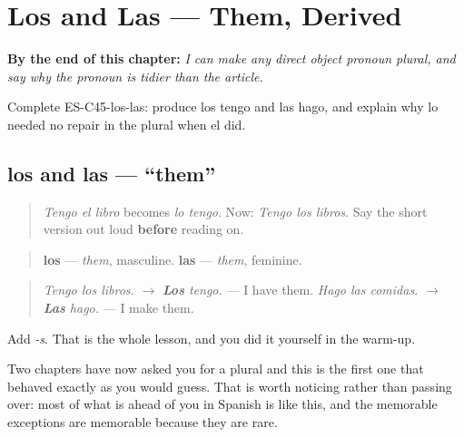 
\chapter{Los and Las --- Them, Derived}
\label{ch:pronoun-plural}

\begin{chapteropening}
\textbf{By the end of this chapter:} \emph{I can make any direct object pronoun plural, and say why the pronoun is tidier than the article.}

Complete ES-C45-los-las: produce los tengo and las hago, and explain why lo needed no repair in the plural when el did.
\end{chapteropening}

\section[los, las]{los and las — \textquotedblleft{}them\textquotedblright{}}

\label{lesson:ES-C45-los-las}



\begin{quote}
\emph{Tengo el libro} becomes \emph{lo tengo}. Now: \emph{Tengo los libros}. Say the short version out loud \textbf{before} reading on.
\end{quote}

\begin{grammarlens}[title={Grammar Lens: you were right}]
\begin{quote}
\textbf{los} — \emph{them}, masculine. \textbf{las} — \emph{them}, feminine.
\end{quote}

\begin{quote}
\emph{Tengo los libros.} $\to$ \emph{\textbf{Los} tengo.} — I have them. \emph{Hago las comidas.} $\to$ \emph{\textbf{Las} hago.} — I make them.
\end{quote}

Add \emph{-s}. That is the whole lesson, and you did it yourself in the warm-up.

Two chapters have now asked you for a plural and this is the first one that behaved exactly as you would guess. That is worth noticing rather than passing over: most of what is ahead of you in Spanish is like this, and the memorable exceptions are memorable because they are rare.
\end{grammarlens}

